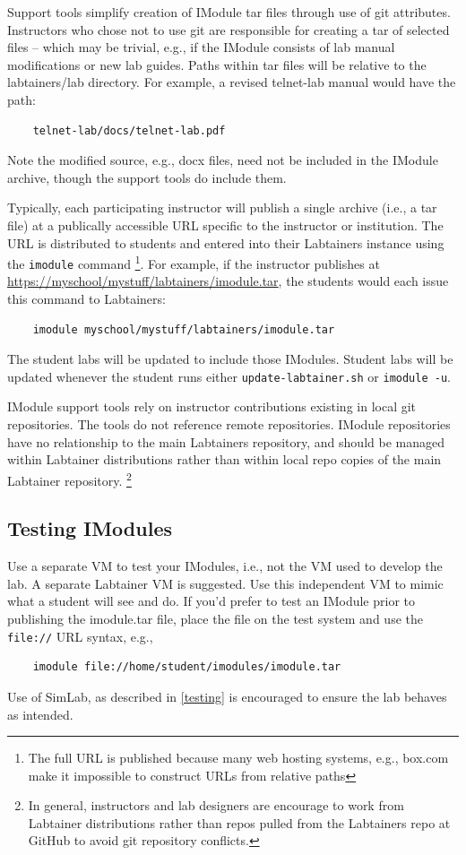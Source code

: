 \documentclass[12pt]{article}
\begin{document}
Support tools simplify creation of IModule tar files through use of git attributes.
Instructors who chose not to use git are responsible for creating a tar of selected
files -- which may be trivial, e.g., if the IModule consists of lab manual modifications
or new lab guides.  Paths within tar files will be relative to the labtainers/lab
directory.  For example, a revised telnet-lab manual would have the path:
\begin{verbatim}
    telnet-lab/docs/telnet-lab.pdf
\end{verbatim}
\noindent Note the modified source, e.g., docx files, need not be included in the IModule
archive, though the support tools do include them.

Typically, each participating instructor will publish a single archive (i.e., a tar file)
at a publically accessible URL specific to the instructor or institution. The URL 
is distributed to students and entered into their Labtainers 
instance using the {\tt imodule} command \footnote{The full URL is published because many
web hosting systems, e.g., box.com make it impossible to construct URLs from relative paths}.  
For example, if the instructor publishes
at \url{https://myschool/mystuff/labtainers/imodule.tar}, the students would each issue
this command to Labtainers:
\begin{verbatim}
    imodule myschool/mystuff/labtainers/imodule.tar
\end{verbatim} 

The student labs will be updated to include those IModules.  Student labs
will be updated whenever the student runs either {\tt update-labtainer.sh} or {\tt imodule -u}.

IModule support tools rely on instructor contributions existing in local git repositories.
The tools do not reference remote repositories.  IModule repositories have no relationship
to the main Labtainers repository, and should be managed within Labtainer
distributions rather than within local repo copies of the main Labtainer repository.   \footnote{In general,
instructors and lab designers are encourage to work from Labtainer distributions rather
than repos pulled from the Labtainers repo at GitHub to avoid git repository conflicts.}

\subsection{Testing IModules}
Use a separate VM to test your IModules, i.e., not the VM used to develop the lab.  A separate
Labtainer VM is suggested.  Use this independent VM to mimic what a student will see and do.  If
you'd prefer to test an IModule prior to publishing the imodule.tar file, place the file on the
test system and use the {\tt file://} URL syntax, e.g.,
\begin{verbatim}
    imodule file://home/student/imodules/imodule.tar
\end{verbatim} 
\noindent Use of SimLab, as described in \ref{testing} is encouraged to ensure the lab behaves as intended.
\end{document}

